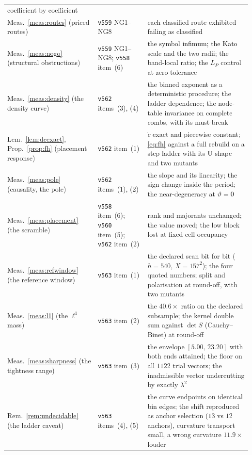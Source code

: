 \documentclass[11pt,a4paper]{article}
\theoremstyle{plain}
\theoremstyle{definition}
\begin{document}
{\begin{xltabular}{\textwidth}{@{}llY@{}}
    coefficient by coefficient \\
Meas.~\ref{meas:routes} (priced routes)
  & \texttt{v559} NG1--NG8
  & each classified route exhibited failing as classified \\
Meas.~\ref{meas:nogo} (structural obstructions)
  & \texttt{v559} NG1--NG8; \texttt{v558} item~(6)
  & the symbol infimum; the Kato scale and the two radii; the band-local
    ratio; the $L_P$ control at zero tolerance \\
Meas.~\ref{meas:density} (the density curve)
  & \texttt{v562} items~(3), (4)
  & the binned exponent as a deterministic procedure; the ladder
    dependence; the node-table invariance on complete combs, with its
    must-break \\
Lem.~\ref{lem:dcexact}, Prop.~\ref{prop:fh} (placement response)
  & \texttt{v562} item~(1)
  & $\dot c$ exact and piecewise constant; \eqref{eq:fh} against a full
    rebuild on a step ladder with its U-shape and two mutants \\
Meas.~\ref{meas:pole} (causality, the pole)
  & \texttt{v562} items~(1), (2)
  & the slope and its linearity; the sign change inside the period; the
    near-degeneracy at $\vartheta=0$ \\
Meas.~\ref{meas:placement} (the scramble)
  & \texttt{v558} item~(6); \texttt{v560} item~(5); \texttt{v562} item~(2)
  & rank and majorants unchanged; the value moved; the low block lost at
    fixed cell occupancy \\
Meas.~\ref{meas:refwindow} (the reference window)
  & \texttt{v563} item~(1)
  & the declared scan bit for bit ($h=540$, $X=157^{2}$); the four quoted
    numbers; split and polarisation at round-off, with two mutants \\
Meas.~\ref{meas:l1} (the $\ell^{1}$ mass)
  & \texttt{v563} item~(2)
  & the $40.6\times$ ratio on the declared subsample; the kernel double sum
    against $\det S$ (Cauchy--Binet) at round-off \\
Meas.~\ref{meas:sharpness} (the tightness range)
  & \texttt{v563} item~(3)
  & the envelope $[5.00,\,23.20]$ with both ends attained; the floor on all
    $1122$ trial vectors; the inadmissible vector undercutting by exactly
    $\lambda^{2}$ \\
Rem.~\ref{rem:undecidable} (the ladder caveat)
  & \texttt{v563} items~(4), (5)
  & the curve endpoints on identical bin edges; the shift reproduced as
    anchor selection ($13$ vs $12$ anchors), curvature transport small,
    a wrong curvature $11.9\times$ louder \\

\end{xltabular}}
\end{document}
